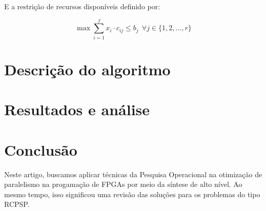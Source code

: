 \documentclass[journal]{IEEEtran}
\begin{document}
        E a restrição de recursos disponíveis definido por:

        \[
        \max_{} \sum_{i=1}^{f} x_i \cdot c_{ij} \leq b_j~~\forall j \in \{1, 2, \ldots, r\}
        \]
        
    \section{Descrição do algoritmo}


        
    \section{Resultados e análise}


    
    \section{Conclusão}            

    Neste artigo, buscamos aplicar técnicas da Pesquisa Operacional na otimização de paralelismo na progamação de FPGAs por meio da síntese de alto nível. Ao mesmo tempo, isso significou uma revisão das soluções para os problemas do tipo RCPSP.
    
    
\end{document}
